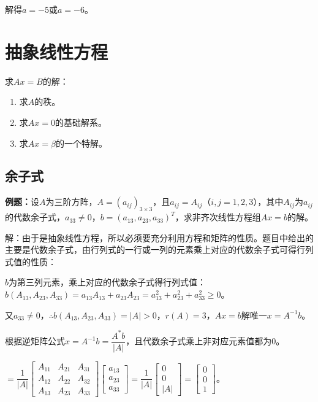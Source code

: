 解得$a=-5$或$a=-6$。

\section{抽象线性方程}

求$Ax=B$的解：

\begin{enumerate}
    \item 求$A$的秩。
    \item 求$Ax=0$的基础解系。
    \item 求$Ax=\beta$的一个特解。
\end{enumerate}

\subsection{余子式}

\textbf{例题：}设$A$为三阶方阵，$A=(a_{ij})_{3\times3}$，且$a_{ij}=A_{ij}$（$i,j=1,2,3$），其中$A_{ij}$为$a_{ij}$的代数余子式，$a_{33}\neq0$，$b=(a_{13},a_{23},a_{33})^T$，求非齐次线性方程组$Ax=b$的解。

解：由于是抽象线性方程，所以必须要充分利用方程和矩阵的性质。题目中给出的主要是代数余子式，由行列式的一行或一列的元素乘上对应的代数余子式可得行列式值的性质：

$b$为第三列元素，乘上对应的代数余子式得行列式值：$b(A_{13},A_{23},A_{33})=a_{13}A_{13}+a_{23}A_{23}=a_{13}^2+a_{23}^2+a_{33}^2\geqslant0$。

又$a_{33}\neq0$，$\therefore b(A_{13},A_{23},A_{33})=\vert A\vert>0$，$r(A)=3$，$Ax=b$解唯一$x=A^{-1}b$。

根据逆矩阵公式$x=A^{-1}b=\dfrac{A^*b}{\vert A\vert}$，且代数余子式乘上非对应元素值都为0。

$=\dfrac{1}{\vert A\vert}\left[\begin{array}{ccc}
    A_{11} & A_{21} & A_{31} \\
    A_{12} & A_{22} & A_{32} \\
    A_{13} & A_{23} & A_{33} 
\end{array}\right]\left[\begin{array}{c}
    a_{13} \\
    a_{23} \\
    a_{33}
\end{array}\right]=\dfrac{1}{\vert A\vert}\left[\begin{array}{c}
    0 \\
    0 \\
    \vert A\vert
\end{array}\right]=\left[\begin{array}{c}
    0 \\
    0 \\
    1
\end{array}\right]$。

